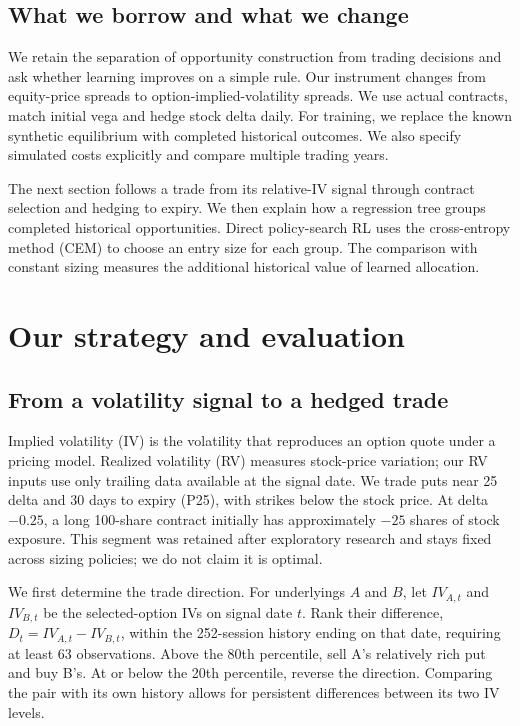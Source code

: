 \documentclass[11pt,letterpaper]{article}
\begin{document}
\subsection*{What we borrow and what we change}
We retain the separation of opportunity construction from trading decisions
and ask whether learning improves on a simple rule. Our instrument changes
from equity-price spreads to option-implied-volatility spreads. We use actual
contracts, match initial vega and hedge stock delta daily. For training, we
replace the known synthetic equilibrium with completed historical outcomes.
We also specify simulated costs explicitly and compare multiple trading years.

The next section follows a trade from its relative-IV signal through contract
selection and hedging to expiry. We then explain how a regression tree groups
completed historical opportunities. Direct policy-search RL uses the
cross-entropy method (CEM) to choose an entry size for each group. The comparison
with constant sizing measures the additional historical value of learned allocation.

\clearpage
\section{Our strategy and evaluation}
\subsection{From a volatility signal to a hedged trade}
Implied volatility (IV) is the volatility that reproduces an option quote under
a pricing model. Realized volatility (RV) measures stock-price variation; our
RV inputs use only trailing data available at the signal date. We trade puts
near 25 delta and 30 days to expiry (P25), with strikes below the stock price.
At delta $-0.25$, a long 100-share contract initially has approximately $-25$
shares of stock exposure. This segment was retained after exploratory research
and stays fixed across sizing policies; we do not claim it is optimal.

We first determine the trade direction. For underlyings $A$ and $B$, let
$IV_{A,t}$ and $IV_{B,t}$ be the selected-option IVs on signal date $t$.
Rank their difference, $D_t=IV_{A,t}-IV_{B,t}$, within the 252-session history
ending on that date, requiring at least 63 observations. Above the 80th
percentile, sell A's relatively rich put and buy B's. At or below the 20th
percentile, reverse the direction. Comparing the pair with its own history
allows for persistent differences between its two IV levels.
\end{document}
